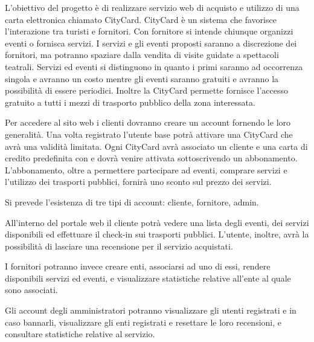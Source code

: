 L’obiettivo del progetto è di realizzare servizio web di acquisto e utilizzo di una carta elettronica chiamato CityCard.
CityCard è un sistema che favorisce l’interazione tra turisti e fornitori. Con fornitore si intende chiunque organizzi eventi o fornisca servizi.
I servizi e gli eventi proposti saranno a discrezione dei fornitori, ma potranno spaziare dalla vendita di visite guidate a spettacoli teatrali. 
Servizi ed eventi si distinguono in quanto i primi saranno ad occorrenza singola e avranno un costo mentre gli eventi saranno gratuiti e avranno la possibilità di essere periodici.
Inoltre la CityCard permette fornisce l'accesso gratuito a tutti i mezzi di trasporto pubblico della zona interessata.

Per accedere al sito web i clienti dovranno creare un account fornendo le loro generalità. Una volta registrato l’utente base potrà attivare una CityCard che avrà una validità limitata. 
Ogni CityCard avrà associato un cliente e una carta di credito predefinita con e dovrà venire attivata sottoscrivendo un abbonamento. 
L'abbonamento, oltre a permettere partecipare ad eventi, comprare servizi e l'utilizzo dei trasporti pubblici, fornirà uno sconto sul prezzo dei servizi. 


Si prevede l'esistenza di tre tipi di account: cliente, fornitore, admin.

All’interno del portale web il cliente potrà vedere una lista degli eventi, dei servizi disponibili ed effettuare il check-in sui trasporti pubblici. 
L'utente, inoltre, avrà la possibilità di lasciare una recensione per il servizio acquistati.

I fornitori potranno invece creare enti, associarsi ad uno di essi, rendere disponibili servizi ed eventi, e visualizzare statistiche relative all'ente al quale sono associati.

Gli account degli amministratori potranno visualizzare gli utenti registrati e in caso bannarli, visualizzare gli enti registrati e resettare le loro recensioni, e consultare statistiche relative al servizio.
